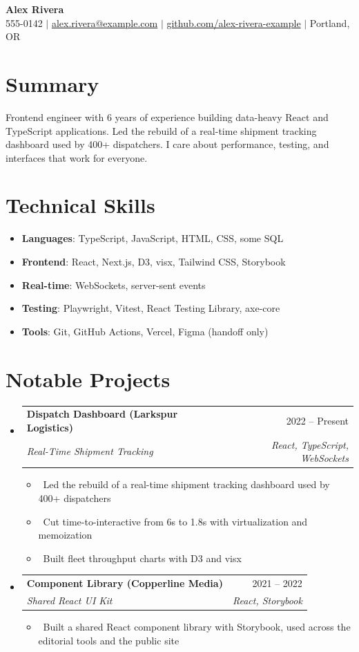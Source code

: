 \documentclass[letterpaper,10pt]{article}
\makeatletter
\newcommand{\resumeItem}[1]{\item\small{#1}}
\newcommand{\resumeSubheading}[4]{
\vspace{-1pt}\item
  \begin{tabular*}{0.97\textwidth}[t]{l@{\extracolsep{\fill}}r}
    \textbf{#1} & #2 \\
    \textit{#3} & \textit{#4} \\
  \end{tabular*}\vspace{-7pt}
}
\newcommand{\resumeSubHeadingList}{\begin{itemize}[leftmargin=0.15in, label={}]}
\newcommand{\resumeSubHeadingListEnd}{\end{itemize}}
\makeatother
\begin{document}
\begin{center}
  \textbf{\Huge Alex Rivera} \\
  \small 555-0142 $|$ \href{mailto:alex.rivera@example.com}{alex.rivera@example.com} $|$
  \href{https://github.com/alex-rivera-example}{github.com/alex-rivera-example} $|$
  Portland, OR
\end{center}

\section*{Summary}
Frontend engineer with 6 years of experience building data-heavy React and TypeScript applications. Led the rebuild of a real-time shipment tracking dashboard used by 400+ dispatchers. I care about performance, testing, and interfaces that work for everyone.

\section{Technical Skills}
\resumeSubHeadingList
  \resumeItem{\textbf{Languages}: TypeScript, JavaScript, HTML, CSS, some SQL}
  \resumeItem{\textbf{Frontend}: React, Next.js, D3, visx, Tailwind CSS, Storybook}
  \resumeItem{\textbf{Real-time}: WebSockets, server-sent events}
  \resumeItem{\textbf{Testing}: Playwright, Vitest, React Testing Library, axe-core}
  \resumeItem{\textbf{Tools}: Git, GitHub Actions, Vercel, Figma (handoff only)}
\resumeSubHeadingListEnd

\section{Notable Projects}
\resumeSubHeadingList
  \resumeSubheading
      {Dispatch Dashboard (Larkspur Logistics)}{2022 -- Present}
      {Real-Time Shipment Tracking}{React, TypeScript, WebSockets}
      \resumeSubHeadingList
          \resumeItem{\textbullet\ Led the rebuild of a real-time shipment tracking dashboard used by 400+ dispatchers}
          \resumeItem{\textbullet\ Cut time-to-interactive from 6s to 1.8s with virtualization and memoization}
          \resumeItem{\textbullet\ Built fleet throughput charts with D3 and visx}
      \resumeSubHeadingListEnd
  \resumeSubheading
      {Component Library (Copperline Media)}{2021 -- 2022}
      {Shared React UI Kit}{React, Storybook}
      \resumeSubHeadingList
          \resumeItem{\textbullet\ Built a shared React component library with Storybook, used across the editorial tools and the public site}
      \resumeSubHeadingListEnd
\resumeSubHeadingListEnd
\end{document}
